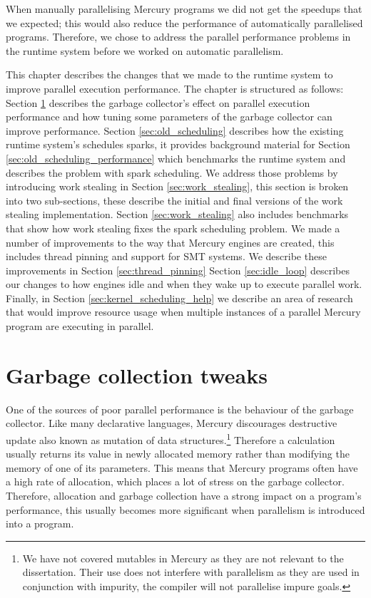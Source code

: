 

When manually parallelising Mercury programs we
did not get the speedups that we expected;
this would also reduce the performance of automatically parallelised
programs.
Therefore,
we chose to address the parallel performance problems
in the runtime system before we worked on automatic parallelism.

This chapter describes the changes that we made to the runtime system to
improve parallel execution performance.
The chapter is structured as follows:
Section \ref{sec:gc} describes the garbage collector's effect on parallel
execution performance and how tuning some parameters of the garbage
collector can improve performance.
Section \ref{sec:old_scheduling} describes how the existing runtime
system's schedules sparks,
it provides background material for Section
\ref{sec:old_scheduling_performance}
which benchmarks the runtime system and describes the problem with spark
scheduling.
We address those problems by introducing work stealing in Section
\ref{sec:work_stealing},
this section is broken into two sub-sections,
these describe the initial and final versions of the work stealing
implementation.
Section \ref{sec:work_stealing} also includes benchmarks that show
how work stealing fixes the spark scheduling problem.
We made a number of improvements to the way that Mercury engines are created,
this includes thread pinning and support for SMT systems.
We describe these improvements in Section \ref{sec:thread_pinning}
Section \ref{sec:idle_loop} describes our changes to how engines idle
and when they wake up to execute parallel work.
Finally, in Section \ref{sec:kernel_scheduling_help}
we describe an area of research that would improve resource usage when
multiple instances of a parallel Mercury program are executing in parallel.

\section{Garbage collection tweaks}
\label{sec:gc}

One of the sources of poor parallel performance is the behaviour of the
garbage collector.
Like many declarative languages,
Mercury discourages destructive update also known as mutation of data
structures.\footnote{
    We have not covered mutables in Mercury as they are not relevant to the
    dissertation.
    Their use does not interfere with parallelism as they are used in
    conjunction with impurity,
    the compiler will not parallelise impure goals.}
Therefore a calculation usually returns its value in newly allocated memory
rather than modifying the memory of one of its parameters.
This means that Mercury programs often have a high rate of allocation,
which places a lot of stress on the garbage collector.
Therefore,
allocation and garbage collection have a strong impact on a program's
performance,
this usually becomes more significant when parallelism is introduced into a
program.

